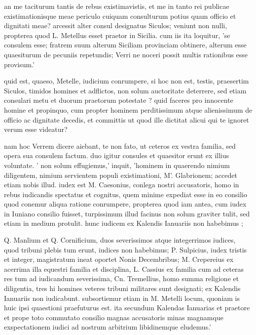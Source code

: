  an me taciturum tantis de rebus existimavistis, et me in tanto rei publicae existimationisque meae periculo cuiquam consulturum potius quam officio et dignitati meae? arcessit alter consul designatus Siculos; veniunt non nulli, propterea quod L. Metellus esset praetor in Sicilia. cum iis ita loquitur, 'se consulem esse; fratrem suum alterum Siciliam provinciam obtinere, alterum esse quaesiturum de pecuniis repetundis; Verri ne noceri possit multis rationibus esse provisum.'

 quid est, quaeso, Metelle, iudicium conrumpere, si hoc non est, testis, praesertim Siculos, timidos homines et adflictos, non solum auctoritate deterrere, sed etiam consulari metu et duorum praetorum potestate ? quid faceres pro innocente homine et propinquo, cum propter hominem perditissimum atque alienissimum de officio ac dignitate decedis, et committis ut quod ille dictitat alicui qui te ignoret verum esse videatur?

 nam hoc Verrem dicere aiebant, te non fato, ut ceteros ex vestra familia, sed opera sua consulem factum. duo igitur consules et quaesitor erunt ex illius voluntate. ' non solum effugiemus,' inquit, 'hominem in quaerendo nimium diligentem, nimium servientem populi existimationi, M'. Glabrionem; accedet etiam nobis illud. iudex est M. Caesonius, conlega nostri accusatoris, homo in rebus iudicandis spectatus et cognitus, quem minime expediat esse in eo consilio quod conemur aliqua ratione conrumpere, propterea quod iam antea, cum iudex in Iuniano consilio fuisset, turpissimum illud facinus non solum graviter tulit, sed etiam in medium protulit. hunc iudicem ex Kalendis Ianuariis non habebimus ;

 Q. Manlium et Q. Cornificium, duos severissimos atque integerrimos iudices, quod tribuni plebis tum erunt, iudices non habebimus; P. Sulpicius, iudex tristis et integer, magistratum ineat oportet Nonis Decembribus; M. Crepereius ex acerrima illa equestri familia et disciplina, L. Cassius ex familia cum ad ceteras res tum ad iudicandum severissima, Cn. Tremellius, homo summa religione et diligentia, tres hi homines veteres tribuni militares sunt designati; ex Kalendis Ianuariis non iudicabunt. subsortiemur etiam in M. Metelli locum, quoniam is huic ipsi quaestioni praefuturus est. ita secundum Kalendas Ianuarias et praetore et prope toto commutato consilio magnas accusatoris minas magnamque exspectationem iudici ad nostrum arbitrium libidinemque eludemus.'

